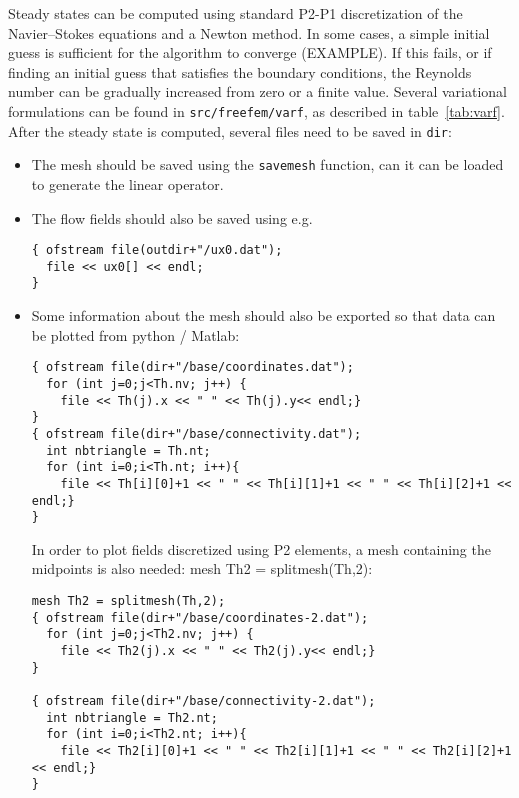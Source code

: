 \documentclass[12pts]{article}%
\begin{document}
Steady states can be computed using standard P2-P1 discretization of
the Navier--Stokes equations and a Newton method. In some cases, a
simple initial guess is sufficient for the algorithm to converge
(EXAMPLE). If this fails, or if finding an initial guess that
satisfies the boundary conditions, the Reynolds number can be
gradually increased from zero or a finite value. Several variational
formulations can be found in \texttt{src/freefem/varf}, as described
in table~\ref{tab:varf}. After the steady state is computed, several
files need to be saved in \texttt{dir}:
\begin{itemize}
\item The mesh should be saved using the \texttt{savemesh} function,
  can it can be loaded to generate the linear operator.
\item The flow fields should also be saved using e.g. 
\begin{verbatim}
{ ofstream file(outdir+"/ux0.dat");
  file << ux0[] << endl;
} 
\end{verbatim}
\item Some information about the mesh should also be exported so that
  data can be plotted from python / Matlab:
\begin{verbatim}
{ ofstream file(dir+"/base/coordinates.dat");
  for (int j=0;j<Th.nv; j++) {
    file << Th(j).x << " " << Th(j).y<< endl;}
}
{ ofstream file(dir+"/base/connectivity.dat");
  int nbtriangle = Th.nt;
  for (int i=0;i<Th.nt; i++){
    file << Th[i][0]+1 << " " << Th[i][1]+1 << " " << Th[i][2]+1 << endl;}
}
\end{verbatim}
  In order to plot fields discretized using P2 elements, a mesh
  containing the midpoints is also needed: mesh Th2 = splitmesh(Th,2):
\begin{verbatim}
mesh Th2 = splitmesh(Th,2);
{ ofstream file(dir+"/base/coordinates-2.dat");
  for (int j=0;j<Th2.nv; j++) {
    file << Th2(j).x << " " << Th2(j).y<< endl;}
}

{ ofstream file(dir+"/base/connectivity-2.dat");
  int nbtriangle = Th2.nt;
  for (int i=0;i<Th2.nt; i++){
    file << Th2[i][0]+1 << " " << Th2[i][1]+1 << " " << Th2[i][2]+1 << endl;}
}
\end{verbatim}
\end{itemize}
\end{document}
